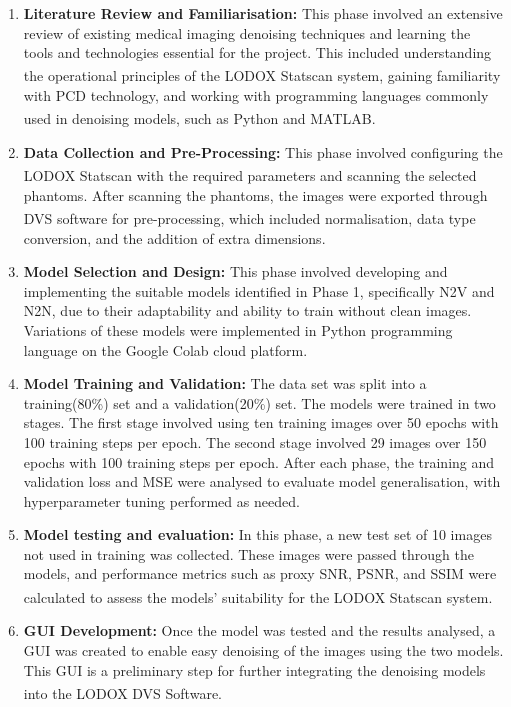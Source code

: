 \begin{enumerate}
    \item {\textbf{Literature Review and Familiarisation:} This phase involved an extensive review of existing medical imaging denoising techniques and learning the tools and technologies essential for the project. This included understanding the operational principles of the LODOX\textsuperscript{\textregistered} Statscan\textsuperscript{\textregistered} system, gaining familiarity with \gls{PCD} technology, and working with programming languages commonly used in denoising models, such as Python and MATLAB\textsuperscript{\textregistered}.}

    \item \textbf{Data Collection and Pre-Processing:} This phase involved configuring the LODOX\textsuperscript{\textregistered} Statscan\textsuperscript{\textregistered} with the required parameters and scanning the selected phantoms. After scanning the phantoms, the images were exported through DVS\textsuperscript{\textregistered} software for pre-processing, which included normalisation, data type conversion, and the addition of extra dimensions.
    \item \textbf{Model Selection and Design:} This phase involved developing and implementing the suitable models identified in Phase 1, specifically \gls{N2V} and \gls{N2N}, due to their adaptability and ability to train without clean images. Variations of these models were implemented in Python programming language on the Google Colab cloud platform.
    \item \textbf{Model Training and Validation:} The data set was split into a training(80\%) set and a validation(20\%) set. The models were trained in two stages. The first stage involved using ten training images over 50 epochs with 100 training steps per epoch. The second stage involved 29 images over 150 epochs with 100 training steps per epoch. After each phase, the training and validation loss and \gls{MSE} were analysed to evaluate model generalisation, with hyperparameter tuning performed as needed.
    \item \textbf{Model testing and evaluation: }In this phase, a new test set of 10 images not used in training was collected. These images were passed through the models, and performance metrics such as proxy \gls{SNR}, \gls{PSNR}, and \gls{SSIM} were calculated to assess the models' suitability for the LODOX\textsuperscript{\textregistered} Statscan\textsuperscript{\textregistered} system.
    \item \textbf{\gls{GUI} Development:} Once the model was tested and the results analysed, a \gls{GUI} was created to enable easy denoising of the images using the two models. This \gls{GUI} is a preliminary step for further integrating the denoising models into the LODOX\textsuperscript{\textregistered} DVS\textsuperscript{\textregistered} Software.
\end{enumerate}

